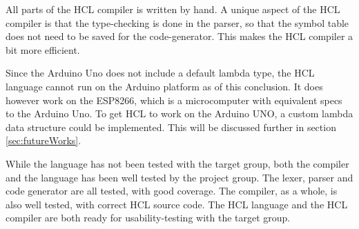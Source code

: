 All parts of the HCL compiler is written by hand.
A unique aspect of the HCL compiler is that the type-checking is done in the parser, so that the symbol table does not need to be saved for the code-generator.
This makes the HCL compiler a bit more efficient.

Since the Arduino Uno does not include a default lambda type, the HCL language cannot run on the Arduino platform as of this conclusion.
It does however work on the ESP8266, which is a microcomputer with equivalent specs to the Arduino Uno.
To get HCL to work on the Arduino UNO, a custom lambda data structure could be implemented.
This will be discussed further in section \ref{sec:futureWorks}.

While the language has not been tested with the target group, both the compiler and the language has been well tested by the project group.
The lexer, parser and code generator are all tested, with good coverage.
The compiler, as a whole, is also well tested, with correct HCL source code.
The HCL language and the HCL compiler are both ready for usability-testing with the target group.



